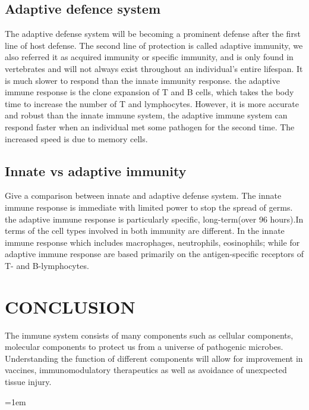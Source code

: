 \documentclass[12pt]{article}
\begin{document}
\subsection{Adaptive defence system}
The adaptive defense system will be becoming a prominent defense after the first line of host defense.
The second line of protection is called adaptive immunity, we also referred it as acquired immunity or specific immunity, and is only found in vertebrates and will not always exist throughout an individual's entire lifespan. It is much slower to respond than the innate immunity response. the adaptive immune response is the clone expansion of T and B cells, which takes the body time to increase the number of T and lymphocytes. However, it is more accurate and robust than the innate immune system, the adaptive immune system can respond faster when an individual met some pathogen for the second time. The increased speed is due to memory cells. 

\subsection{Innate vs adaptive immunity}
Give a comparison between innate and adaptive defense system. The innate immune response is immediate with limited power to stop the spread of germs. the adaptive immune response is particularly specific, long-term(over 96 hours).In terms of the cell types involved in both immunity are different. In the innate immune response which includes macrophages, neutrophils, eosinophils; while for adaptive immune response are based primarily on the antigen-specific receptors of T- and B-lymphocytes.

\section{CONCLUSION}
The immune system consists of many components such as cellular components, molecular components to protect us from a universe of pathogenic microbes. Understanding the function of different components will allow for improvement in vaccines, immunomodulatory therapeutics as well as avoidance of unexpected tissue injury.


\emergencystretch=1em
\printbibliography[title=Reference]
\end{document}
